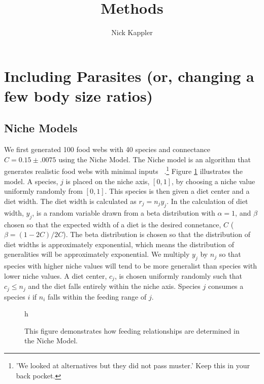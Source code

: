 \documentclass[11pt]{amsart}
\title{Methods}
\author{Nick Kappler}
\begin{document}
\maketitle
\section{Including Parasites (or, changing a few body size ratios)}


\subsection{Niche Models\label{sec:structure}}

We first generated 100 food webs with 40 species and connectance $C=0.15\pm .0075$ using the Niche Model.  The Niche model is an algorithm that generates realistic food webs with minimal inputs ~\cite{Williams2000}.\footnote{'We looked at alternatives but they did not pass muster.' Keep this in your back pocket.}  Figure \ref{fig:nicheModel} illustrates the model.  A species, $j$ is placed on the niche axis, $[0,1]$, by choosing a niche value uniformly randomly from $[0,1]$.  This species is then given a diet center and a diet width.  The diet width is calculated as $r_j=n_jy_j$.  In the calculation of diet width, $y_j$, is a random variable drawn from a beta distribution with $\alpha = 1$, and $\beta$ chosen so that the expected width of a diet is the desired connetance, $C$ ($\beta = (1-2C)/2C$).  The beta distribution is chosen so that the distribution of diet widths is approximately exponential, which means the distribution of generalities will be approximately exponential.  We multiply $y_j$ by $n_j$ so that species with higher niche values will tend to be more generalist than species with lower niche values.  A diet center, $c_j$, is chosen uniformly randomly such that $c_j \leq n_j$ and the diet falls entirely within the niche axis.  Species $j$ consumes a species $i$ if $n_i$ falls within the feeding range of $j$.  


\begin{figure}{h}
\caption{This figure demonstrates how feeding relationships are determined in the Niche Model.\label{fig:nicheModel}}
\end{figure}
\end{document}
